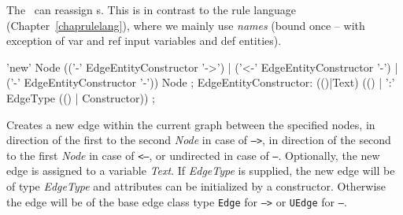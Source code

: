 \begin{note}
The \GrShell\ can reassign s.
This is in contrast to the rule language (Chapter~\ref{chaprulelang}), where we mainly use \emph{names}
(bound once -- with exception of var and ref input variables and def entities).
\end{note}

\begin{rail}
  'new' Node (('-' EdgeEntityConstructor '->') | ('<-' EdgeEntityConstructor '-') | ('-' EdgeEntityConstructor '-')) Node ;
EdgeEntityConstructor:
  (()|Text) (() | ':' EdgeType (() | Constructor)) ;
\end{rail}
Creates a new edge within the current graph between the specified nodes,
in direction of the first to the second \emph{Node} in case of \texttt{-->},
in direction of the second to the first \emph{Node} in case of \texttt{<--},
or undirected in case of \texttt{--}.
Optionally, the new edge is assigned to a variable \emph{Text}.
If \emph{EdgeType} is supplied, the new edge will be of type \emph{EdgeType} and attributes can be initialized by a constructor.
Otherwise the edge will be of the base edge class type \texttt{Edge} for \texttt{-->} or \texttt{UEdge} for \texttt{--}.

